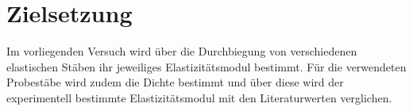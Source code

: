 \section{Zielsetzung}
\label{sec:Zielsetzung}
Im vorliegenden Versuch wird über die Durchbiegung von verschiedenen elastischen Stäben ihr jeweiliges Elastizitätsmodul bestimmt.
Für die verwendeten Probestäbe wird zudem die Dichte bestimmt und über diese wird der experimentell bestimmte Elastizitätsmodul mit den Literaturwerten verglichen.
